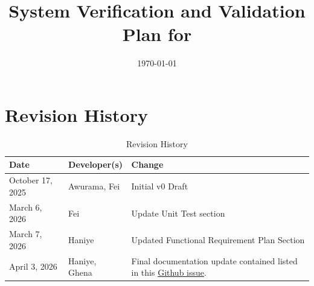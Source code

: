 \documentclass[12pt, titlepage]{article}
\begin{document}
\title{System Verification and Validation Plan for \progname{}}
\author{\authname}
\date{\today}

\maketitle


\section*{Revision History}

\begin{table}[hp]
\caption{Revision History} \label{VnVPlanRevisionHistory}
\begin{tabularx}{\textwidth}{llX}
\toprule
\textbf{Date} & \textbf{Developer(s)} & \textbf{Change}\\
\midrule
October 17, 2025  & Awurama, Fei & Initial v0 Draft\\
March 6, 2026  & Fei & Update Unit Test section\\
March 7, 2026  & Haniye & Updated Functional Requirement Plan Section\\
April 3, 2026 & Haniye, Ghena & Final documentation update contained listed in this \href{https://github.com/thaafei/DomainX/issues/538}{Github issue}.\\
\bottomrule
\end{tabularx}
\end{table}

~\\

\end{document}
